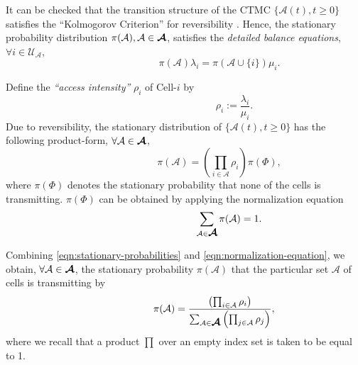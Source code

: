 \documentclass[10pt,a4paper,journal]{IEEEtran}
\theoremstyle{definition}
\theoremstyle{remark}
\theoremstyle{plain}
\newcommand{\bmath}[1]{\mbox{\boldmath$#1$}}
\begin{document}
It can be checked that the transition structure of the CTMC $\{\mathcal{A}(t), t \geq 0\}$ satisfies the ``Kolmogorov Criterion'' for reversibility \cite{theory.kelly79reversibility}. Hence, the stationary probability distribution $\pi(\mathcal{A}), \mathcal{A} \in \bmath{\mathcal{A}}$, satisfies the \textit{detailed balance equations}, $\forall i \in \mathcal{U}_{\mathcal{A}}$, 
\begin{equation}
\label{eqn:detailed-balance-multicell}
\quad \quad \quad \quad \quad \quad \quad \pi(\mathcal{A})\lambda_i = \pi(\mathcal{A} \cup \{i\})\mu_i.
\end{equation}

Define the \textit{``access intensity''} $\rho_i$ of Cell-$i$ by 
\begin{equation}
\label{eqn:varrho-definition}
\quad \quad \quad \quad \quad \quad \quad \quad \quad \quad \rho_i := \frac{\lambda_i}{\mu_i}.
\end{equation} 
Due to reversibility, the stationary distribution of $\{\mathcal{A}(t), t \geq 0\}$ has the following product-form, $\forall \mathcal{A} \in \bmath{\mathcal{A}}$, 
\begin{equation}
\label{eqn:stationary-probabilities}
\quad \quad \quad \quad \quad \quad \quad \pi(\mathcal{A}) = \left( \prod_{i \in \mathcal{A}}\rho_i \right) \pi(\Phi), 
\end{equation} 
where $\pi(\Phi)$ denotes the stationary probability that none of the cells is transmitting. $\pi(\Phi)$ can be obtained by applying the normalization equation 
\begin{equation}
\label{eqn:normalization-equation}
\quad \quad \quad \quad \quad \quad \quad \quad \quad \sum_{\mathcal{A} \in \bmath{\mathcal{A}}} \pi(\mathcal{A}) = 1.
\end{equation}


Combining \eqref{eqn:stationary-probabilities} and \eqref{eqn:normalization-equation}, we obtain, $\forall \mathcal{A} \in \bmath{\mathcal{A}}$, the stationary probability $\pi(\mathcal{A})$ that the particular set $\mathcal{A}$ of cells is transmitting by 
\begin{equation}
\label{eqn:stationary-probabilities-complete}
\quad \quad \quad \quad \quad \quad \pi(\mathcal{A}) = \frac{\left( \prod_{i \in \mathcal{A}}\rho_i
  \right)}{\sum_{\mathcal{A} \in \bmath{\mathcal{A}}} \left( \prod_{j
    \in \mathcal{A}}\rho_j \right)}, 
\end{equation} 
where we recall that a product $\prod$ over an empty index set is taken to be equal to 1.
\end{document}
